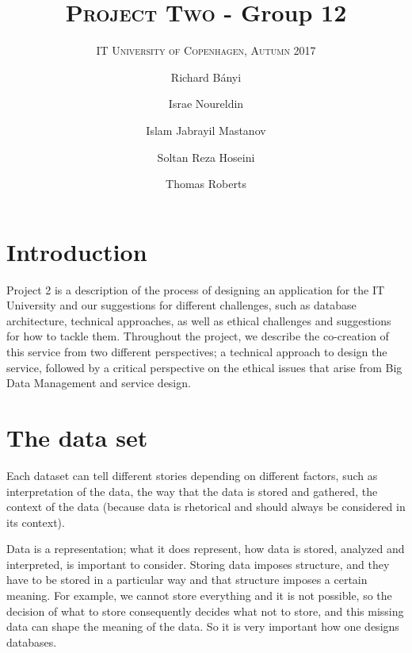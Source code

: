 \documentclass[format=acmsmall, review=false, screen=true]{acmart}
\author{Richard Bányi}
\author{Israe Noureldin}
\author{Islam Jabrayil Mastanov}
\author{Soltan Reza Hoseini}
\author{Thomas Roberts}
\title{\textsc{Project Two} - Group 12}
\subtitle{\textsc{IT University of Copenhagen, Autumn 2017}}
\begin{document}
\maketitle 

\section{Introduction}
Project 2 is a description of the process of designing an application for the IT University and our suggestions for different challenges, such as database architecture, technical approaches, as well as ethical challenges and suggestions for how to tackle them. Throughout the project, we describe the co-creation of this service from two different perspectives; a technical approach to design the service, followed by a critical perspective on the ethical issues that arise from Big Data Management and service design.

\section{The data set}
Each dataset can tell different stories depending on different factors, such as interpretation of the data, the way that the data is stored and gathered, the context of the data (because data is rhetorical and should always be considered in its context).

Data is a representation; what it does represent, how data is stored, analyzed and interpreted, is important to consider. Storing data imposes structure, and they have to be stored in a particular way and that structure imposes a certain meaning. For example, we cannot store everything and it is not possible, so the decision of what to store consequently decides what not to store, and this missing data can shape the meaning of the data. So it is very important how one designs databases.
\end{document}

